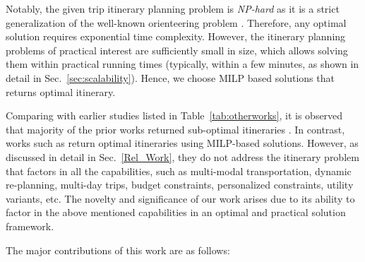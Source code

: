 Notably, the given trip itinerary planning problem is \emph{NP-hard} as it is a strict generalization of the well-known orienteering problem \citep{vansteenwegen2011orienteering, gunawan2016orienteering, vansteenwegen2019orienteering}. Therefore, any optimal solution requires exponential time complexity. However, the itinerary planning problems of practical interest are sufficiently small in size, which allows solving them within practical running times (typically, within a few minutes, as shown in detail in Sec.~\ref{sec:scalability}). Hence, we choose MILP based solutions that returns optimal itinerary.

Comparing with earlier studies listed in Table~\ref{tab:otherworks}, it is observed that majority of the prior works returned sub-optimal itineraries \citep{bolzoni2014efficient, lim2018personalized, panagiotakis2024expectation, vu2022branch}. In contrast, works such as \citep{rambha2024optimized, taylor2018tour, vanzelst2016itinerary} return optimal itineraries using MILP-based solutions. However, as discussed in detail in Sec.~\ref{Rel_Work}, they do not address the itinerary problem that factors in all the capabilities, such as multi-modal transportation, dynamic re-planning, multi-day trips, budget constraints, personalized constraints, utility variants, etc.
The novelty and significance of our work arises due to its ability to factor in the above mentioned capabilities in an optimal and practical solution framework.

The major contributions of this work are as follows:

